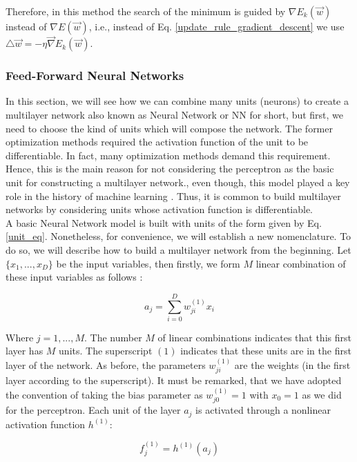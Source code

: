 Therefore, in this method the search of the minimum is guided by $\nabla E_{k} (\vec{w})$ instead of $\nabla E (\vec{w})$, i.e., instead of Eq. \ref{update_rule_gradient_descent} we use $\triangle \vec{w} = -\eta \vec{\nabla} E_{k}(\vec{w})$.


\subsubsection{Feed-Forward Neural Networks}
In this section, we will see how we can combine many units (neurons) to create a multilayer network also known as Neural Network or NN for short, but first, we need to choose the kind of units which will compose the network. The former optimization methods required the activation function of the unit to be differentiable. In fact, many optimization methods demand this requirement. Hence, this is the main reason for not considering the perceptron as the basic unit for constructing a multilayer network., even though, this model played a key role in the history of machine learning \cite{machine_bishop}. Thus, it is common to build multilayer networks by considering units whose activation function is differentiable.\\

A basic Neural Network model is built with units of the form given by Eq. \ref{unit_eq}. Nonetheless, for convenience, we will establish a new nomenclature. To do so, we will describe how to build a multilayer network from the beginning. Let $\{x_{1},...,x_{D}\}$ be the input variables, then firstly, we form $M$ linear combination of these input variables as follows \cite{machine_bishop}:

\begin{equation}
\label{linear_comb_first_layer}
	 a_{j}=\sum_{i=0}^{D} w_{ji}^{(1)}x_{i}
\end{equation}

Where $j=1,...,M$. The number $M$ of linear combinations indicates that this first layer has $M$ units. The superscript $(1)$ indicates that these units are in the first layer of the network. As before, the parameters $w_{ji}^{(1)}$ are the weights (in the first layer according to the superscript). It must be remarked, that we have adopted the convention of taking the bias parameter as $w_{j0}^{(1)}=1$ with $x_{0}=1$ as we did for the perceptron. Each unit of the layer $a_{j}$ is activated through a nonlinear activation function $h^{(1)}$:
 
\begin{equation}
\label{hideen_units_first_layer}
	 f_{j}^{(1)}=h^{(1)}(a_{j})
\end{equation}


